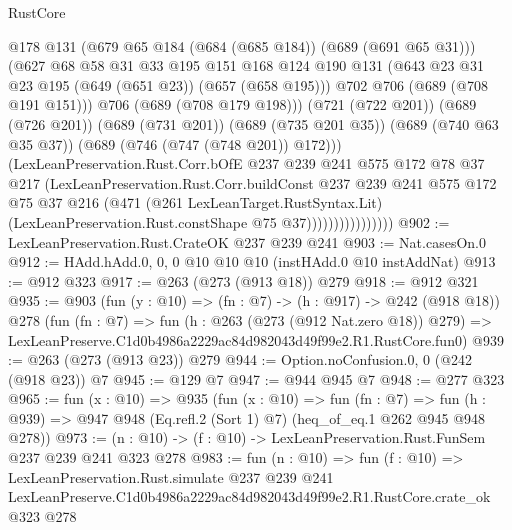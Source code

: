 \begin{lexlean}{RustCore}
\begin{coremodule}
                                @178
                                @131
                                (@679 @65 @184 (@684 (@685 @184)) (@689 (@691 @65 @31)))
                                (@627
                                  @68
                                  @58
                                  @31
                                  @33
                                  @195
                                  @151
                                  @168
                                  @124
                                  @190
                                  @131
                                  (@643 @23 @31 @23 @195 (@649 (@651 @23)) (@657 (@658 @195)))
                                  @702
                                  @706
                                  (@689 (@708 @191 @151)))
                                @706
                                (@689 (@708 @179 @198)))
                              (@721 (@722 @201))
                              (@689 (@726 @201))
                              (@689 (@731 @201))
                              (@689 (@735 @201 @35))
                              (@689 (@740 @63 @35 @37))
                              (@689 (@746 (@747 (@748 @201)) @172)))
                            (LexLeanPreservation.Rust.Corr.bOfE
                              @237
                              @239
                              @241
                              @575
                              @172
                              @78
                              @37
                              @217
                              (LexLeanPreservation.Rust.Corr.buildConst
                                @237
                                @239
                                @241
                                @575
                                @172
                                @75
                                @37
                                @216
                                (@471
                                  (@261 LexLeanTarget.RustSyntax.Lit)
                                  (LexLeanPreservation.Rust.constShape @75 @37))))))))))))))))
@902 := LexLeanPreservation.Rust.CrateOK @237 @239 @241
@903 := Nat.casesOn.{0}
@912 := HAdd.hAdd.{0, 0, 0} @10 @10 @10 (instHAdd.{0} @10 instAddNat)
@913 := @912 @323
@917 := @263 (@273 (@913 @18)) @279
@918 := @912 @321
@935 := @903
    (fun (y : @10) => (fn : @7) -> (h : @917) -> @242 (@918 @18))
    @278
    (fun (fn : @7) =>
    fun (h : @263 (@273 (@912 Nat.zero @18)) @279) =>
    LexLeanPreserve.C1d0b4986a2229ac84d982043d49f99e2.R1.RustCore.fun0)
@939 := @263 (@273 (@913 @23)) @279
@944 := Option.noConfusion.{0, 0} (@242 (@918 @23)) @7
@945 := @129 @7
@947 := @944 @945 @7
@948 := @277 @323
@965 := fun (x : @10) =>
  @935
    (fun (x : @10) =>
    fun (fn : @7) =>
    fun (h : @939) => @947 @948 (Eq.refl.{2} (Sort 1) @7) (heq_of_eq.{1} @262 @945 @948 @278))
@973 := (n : @10) -> (f : @10) -> LexLeanPreservation.Rust.FunSem @237 @239 @241 @323 @278
@983 := fun (n : @10) =>
  fun (f : @10) =>
  LexLeanPreservation.Rust.simulate
    @237
    @239
    @241
    LexLeanPreserve.C1d0b4986a2229ac84d982043d49f99e2.R1.RustCore.crate_ok
    @323
    @278
\end{coremodule}
\end{lexlean}
